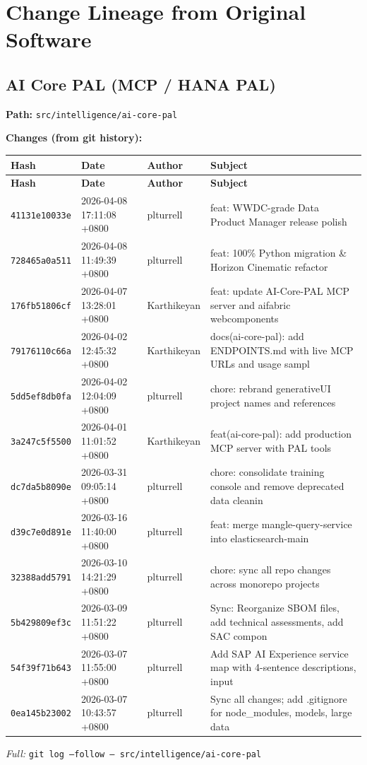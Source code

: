 \documentclass[11pt,a4paper]{article}
\begin{document}
\newpage
\section{Change Lineage from Original Software}

\subsection{AI Core PAL (MCP / HANA PAL)}
\textbf{Path:} \texttt{src/intelligence/ai-core-pal}

\textbf{Changes (from git history):}
\begin{longtable}{|p{2.2cm}|p{3.2cm}|l|p{6cm}|}
\hline \textbf{Hash} & \textbf{Date} & \textbf{Author} & \textbf{Subject} \\ \hline \endfirsthead
\hline \textbf{Hash} & \textbf{Date} & \textbf{Author} & \textbf{Subject} \\ \hline \endhead
\texttt{41131e10033e} & 2026-04-08 17:11:08 +0800 & plturrell & feat: WWDC-grade Data Product Manager release polish \\
\texttt{728465a0a511} & 2026-04-08 11:49:39 +0800 & plturrell & feat: 100\% Python migration \& Horizon Cinematic refactor \\
\texttt{176fb51806cf} & 2026-04-07 13:28:01 +0800 & Karthikeyan & feat: update AI-Core-PAL MCP server and aifabric webcomponents \\
\texttt{79176110c66a} & 2026-04-02 12:45:32 +0800 & Karthikeyan & docs(ai-core-pal): add ENDPOINTS.md with live MCP URLs and usage sampl \\
\texttt{5dd5ef8db0fa} & 2026-04-02 12:04:09 +0800 & plturrell & chore: rebrand generativeUI project names and references \\
\texttt{3a247c5f5500} & 2026-04-01 11:01:52 +0800 & Karthikeyan & feat(ai-core-pal): add production MCP server with PAL tools \\
\texttt{dc7da5b8090e} & 2026-03-31 09:05:14 +0800 & plturrell & chore: consolidate training console and remove deprecated data cleanin \\
\texttt{d39c7e0d891e} & 2026-03-16 11:40:00 +0800 & plturrell & feat: merge mangle-query-service into elasticsearch-main \\
\texttt{32388add5791} & 2026-03-10 14:21:29 +0800 & plturrell & chore: sync all repo changes across monorepo projects \\
\texttt{5b429809ef3c} & 2026-03-09 11:51:22 +0800 & plturrell & Sync: Reorganize SBOM files, add technical assessments, add SAC compon \\
\texttt{54f39f71b643} & 2026-03-07 11:55:00 +0800 & plturrell & Add SAP AI Experience service map with 4-sentence descriptions, input  \\
\texttt{0ea145b23002} & 2026-03-07 10:43:57 +0800 & plturrell & Sync all changes; add .gitignore for node\_modules, models, large data  \\
\hline
\end{longtable}
\textit{Full:} \texttt{git log --follow -- src/intelligence/ai-core-pal}
\end{document}
